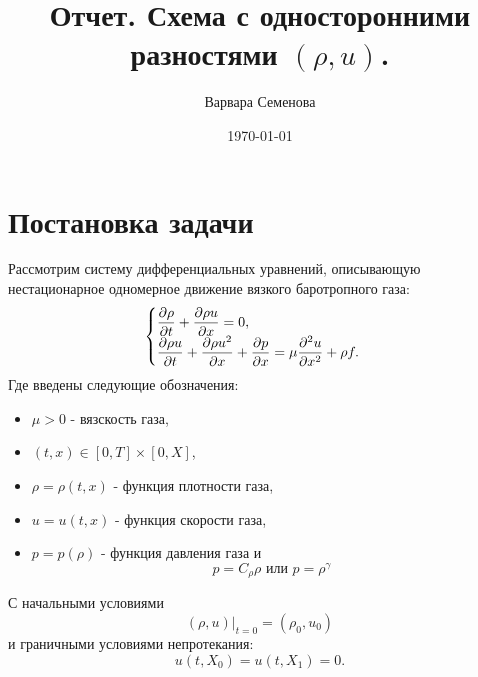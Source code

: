 \documentclass[12pt]{article}
\title{Отчет. Схема с односторонними разностями $(\rho, u)$.}
\author{Варвара Семенова}
\date{\today}
\begin{document}
\makeatletter
\renewcommand{\l@section}{\@dottedtocline{1}{0em}{2.1em}} 
\makeatother

\maketitle
{}
\tableofcontents

\section{Постановка задачи}

Рассмотрим систему дифференциальных уравнений, описывающую нестационарное одномерное движение вязкого баротропного газа:
\begin{equation}
\begin{cases}
$$
\displaystyle\frac {\partial \rho} {\partial t} + \frac{\partial \rho u} {\partial x} = 0,
\\
\displaystyle\frac {\partial \rho u} {\partial t} + \frac {\partial \rho u^2} {\partial x} + \frac {\partial p} {\partial x} = \mu \frac {\partial^2 u} {\partial x^2} + \rho f.
$$
\end{cases}
\end{equation}
Где введены следующие обозначения:
\begin{itemize}
    \item $\mu > 0$ - вязскость газа,
    \item $(t, x) \in [0, T] \times [0, X]$,
    \item $\rho = \rho(t, x)$ - функция плотности газа,
    \item $u = u (t, x)$ - функция скорости газа,
    \item $p = p (\rho)$ - функция давления газа и
\begin{equation}
    p = C_{\rho} \rho \text{ или } p = \rho^{\gamma}
\end{equation}    
\end{itemize}
С начальными условиями
\begin{equation}
(\rho, u)|_{t = 0} = (\rho_0, u_0)
\end{equation}
и граничными условиями непротекания:
\begin{equation}
u(t,X_0) = u(t,X_1) = 0.
\end{equation}
\end{document}
